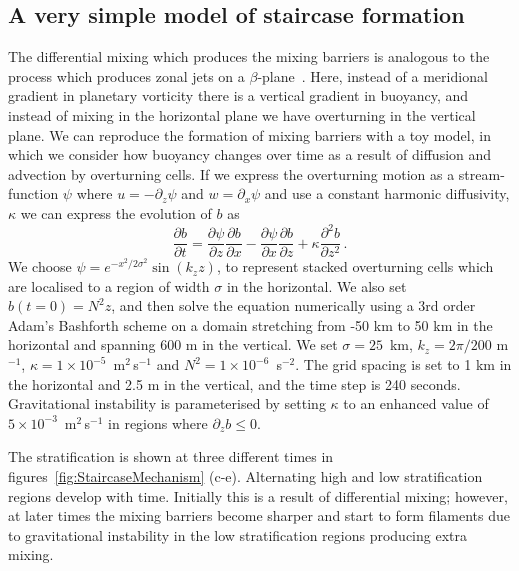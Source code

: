 \subsection{A very simple model of staircase formation}
The differential mixing which produces the mixing barriers is analogous to the process which produces zonal jets on a $\beta$-plane~\citep{Manfroi1999}. Here, instead of a meridional gradient in planetary vorticity there is a vertical gradient in buoyancy, and instead of mixing in the horizontal plane we have overturning in the vertical plane. We can reproduce the formation of mixing barriers with a toy model, in which we consider how buoyancy changes over time as a result of diffusion and advection by overturning cells. If we express the overturning motion as a stream-function $\psi$ where $u = - \partial_z \psi$ and $w = \partial_x \psi$ and use a constant harmonic diffusivity, $\kappa$ we can express the evolution of $b$ as
\begin{equation}
    \frac{\partial b}{\partial t} = \frac{\partial \psi}{\partial z} \frac{\partial b}{\partial x} - \frac{\partial \psi}{\partial x} \frac{\partial b}{\partial z} + \kappa \frac{\partial^2 b}{\partial z^2} \, .
\end{equation}
We choose $\psi = e^{- x^2 / 2\sigma^2} \sin(k_z z)$, to represent stacked overturning cells which are localised to a region of width $\sigma$ in the horizontal. We also set $b(t=0) = N^2 z$, and then solve the equation numerically using a 3rd order Adam's Bashforth scheme on a domain stretching from -50 km to 50 km in the horizontal and spanning 600 m in the vertical. We set $\sigma = 25$~km, $k_z = 2 \pi / 200$ m$^{-1}$, $\kappa = 1 \times 10^{-5}$~m$^2$\,s$^{-1}$ and $N^2 = 1 \times 10^{-6}$~s$^{-2}$. The grid spacing is set to 1 km in the horizontal and 2.5 m in the vertical, and the time step is 240 seconds. Gravitational instability is parameterised by setting $\kappa$ to an enhanced value of $5 \times 10^{-3}$~m$^2$\,s$^{-1}$ in regions where $\partial_z b \leq 0$.

The stratification is shown at three different times in figures~\ref{fig:StaircaseMechanism} (c-e). Alternating high and low stratification regions develop with time. Initially this is a result of differential mixing; however, at later times the mixing barriers become sharper and start to form filaments due to gravitational instability in the low stratification regions producing extra mixing.

